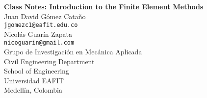 %
\begin{center}
\vspace{50mm}
\Large{\textbf{Class Notes: Introduction to the Finite Element Methods}}
\large
\\[50mm]
Juan David G\'omez Cata\~no\\
\texttt{jgomezc1@eafit.edu.co}\\
Nicol\'as Guar\'in-Zapata\\
\texttt{nicoguarin@gmail.com}
\\[70mm]
Grupo de Investigaci\'on en Mec\'anica Aplicada
\\
Civil Engineering Department
\\
School of Engineering
\\
Universidad EAFIT
\\
Medell\'in, Colombia
\\
\the\year
\end{center}
\thispagestyle{empty}